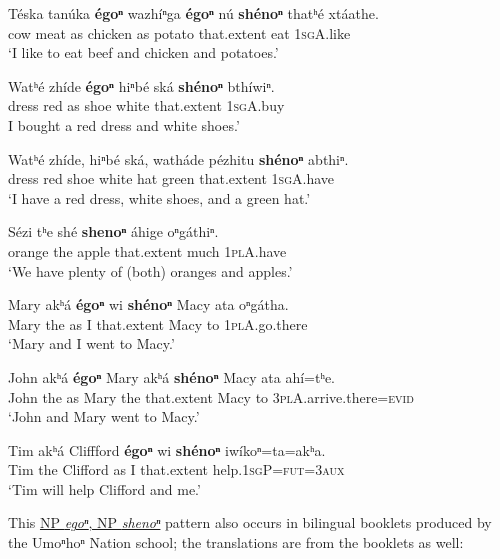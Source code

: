 \documentclass[output=paper]{LSP/langsci}
\begin{document}
\begin{exe}
\ex
\gll T\'eska 	tan\'uka 	\textbf{\'egoⁿ} 	wazh\'iⁿga 	\textbf{\'egoⁿ}	n\'u \textbf{sh\'enoⁿ} thatʰ\'e  xt\'aathe.\\
	cow   	meat    	as     	chicken   	as     	potato 	that.extent 	eat      	\textsc{1sgA}.like\\
\trans `I like to eat beef and chicken and potatoes.'    
 
 \ex
\gll Watʰ\'e 	zh\'ide 	\textbf{\'egoⁿ} 	hiⁿb\'e 	sk\'a    \textbf{	sh\'enoⁿ}  	bth\'iwiⁿ.\\
	dress   	red  	as   	shoe 	white 	that.extent 	\textsc{1sgA}.buy\\
\trans I bought a red dress and white shoes.'  

\ex
\gll Watʰ\'e  zh\'ide,  hiⁿb\'e	sk\'a,  wath\'ade  p\'ezhitu \textbf{sh\'enoⁿ} abthiⁿ.\\ 
dress   	red   	shoe 	white 	hat  	green 	that.extent 	\textsc{1sgA}.have \\
\trans `I have a red dress, white shoes, and a green hat.'   

\ex
\gll S\'ezi  	tʰe 	sh\'e  	\textbf{shenoⁿ} 	\'ahige 	oⁿg\'athiⁿ. \\
	orange 	the 	apple 	that.extent 	much  	\textsc{1plA}.have \\
\trans `We have plenty of (both) oranges and apples.'

\ex
\gll Mary akʰ\'a  	\textbf{\'egoⁿ} wi \textbf{sh\'enoⁿ} Macy ata oⁿg\'atha. \\
 Mary	the  as  	I 	that.extent  	Macy to 	\textsc{1plA}.go.there \\
\trans `Mary and I went to Macy.'

\ex
\gll John akʰ\'a \textbf{\'egoⁿ} Mary akʰ\'a \textbf{sh\'enoⁿ} Macy ata ah\'i=tʰe. \\
 John the 	as  Mary the 	that.extent  Macy to \textsc{3plA}.arrive.there=\textsc{evid} \\
\trans `John and Mary went to Macy.'
 
\ex 
\gll Tim akʰ\'a Cliffford \textbf{\'egoⁿ} wi \textbf{sh\'enoⁿ} iw\'ikoⁿ=ta=akʰa. \\
Tim the Clifford as 	I  that.extent  help.\textsc{1sgP}=\textsc{fut=3aux} \\
\trans `Tim will help Clifford and me.'
\end{exe}

This \underline{NP \textit{egoⁿ}, NP \textit{shenoⁿ}} pattern also occurs in bilingual booklets produced by the Umoⁿhoⁿ Nation school; the translations are from the booklets as well:
	
\end{document}
